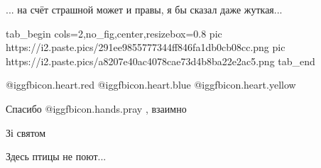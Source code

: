 \begin{itemize}
\begin{itemize}

... на счёт страшной может и правы, я бы сказал даже жуткая...

\ifcmt
  tab_begin cols=2,no_fig,center,resizebox=0.8
     pic https://i2.paste.pics/291ee9855777344ff846fa1db0cb08cc.png
		 pic https://i2.paste.pics/a8207e40ac4078cae73d4b8ba22e2ac5.png
  tab_end
\fi

\end{itemize} %

@igg{fbicon.heart.red} @igg{fbicon.heart.blue}  @igg{fbicon.heart.yellow} 

Спасибо  @igg{fbicon.hands.pray} , взаимно

Зі святом

Здесь птицы не поют...

\end{itemize} %
